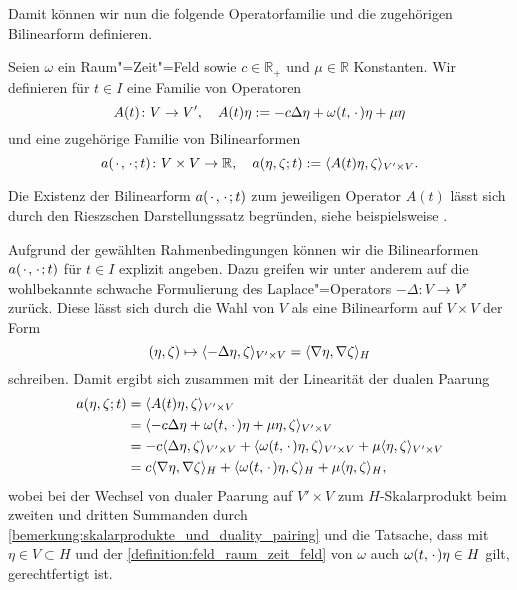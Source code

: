 Damit können wir nun die folgende Operatorfamilie und die zugehörigen Bilinearform definieren.

\begin{Definition}
\label{definition:operator_bilinearform_zeit}
    Seien $\omega$ ein Raum"=Zeit"=Feld sowie $c \in \mathbb{R}_{+}$ und $\mu \in \mathbb{R}$ Konstanten.
    Wir definieren für $t \in I$ eine Familie von Operatoren
    \begin{equation}
        \label{eq:operator_zeit}
        A(t) \colon V \to V', \quad  A(t) \eta := - c \Delta \eta + \omega(t, {\mkern2mu\cdot\mkern2mu}) \eta + \mu \eta
    \end{equation}
    und eine zugehörige Familie von Bilinearformen
    \begin{equation}
        \label{eq:bilinearform_zeit}
        a({\mkern2mu\cdot\mkern2mu}, {\mkern2mu\cdot\mkern2mu}; t) \colon V \times V \to \mathbb{R}, \quad  a(\eta, \zeta; t) := \langle A(t)\eta,\zeta\rangle_{V' \times V}.
    \end{equation}
\end{Definition}

\begin{Bemerkung}
\label{bemerkung:operator_bilinearform_riesz}
    Die Existenz der Bilinearform $a({\mkern2mu\cdot\mkern2mu}, {\mkern2mu\cdot\mkern2mu}; t)$ zum jeweiligen Operator $A(t)$ lässt sich durch den Rieszschen Darstellungssatz begründen, siehe beispielsweise \cite[Theorem \S{}22.1]{Halmos:1957vd}.
\end{Bemerkung}

Aufgrund der gewählten Rahmenbedingungen können wir die Bilinearformen $a({\mkern2mu\cdot\mkern2mu}, {\mkern2mu\cdot\mkern2mu}; t)$ für $t \in I$ explizit angeben.
Dazu greifen wir unter anderem auf die wohlbekannte schwache Formulierung des Laplace"=Operators $- \Delta \colon V \to V'$ zurück.
Diese lässt sich durch die Wahl von $V$ als eine Bilinearform auf $V \times V$ der Form
\begin{equation}
    (\eta, \zeta) \mapsto \langle- \Delta \eta,\zeta\rangle_{V' \times V} = \langle\nabla \eta,\nabla \zeta\rangle_{H}
\end{equation}
schreiben.
Damit ergibt sich zusammen mit der Linearität der dualen Paarung
\begin{equation}
\label{eq:bilinearform_formel}
    \begin{aligned}
        a(\eta, \zeta; t)
            &= \langle A(t) \eta,\zeta\rangle_{V' \times V}
          \\&= \langle-c\Delta \eta + \omega(t, {\mkern2mu\cdot\mkern2mu}) \eta + \mu \eta,\zeta\rangle_{V' \times V}
          \\&= - c\langle\Delta \eta,\zeta\rangle_{V' \times V} + \langle\omega(t, {\mkern2mu\cdot\mkern2mu}) \eta,\zeta\rangle_{V' \times V} + \mu \langle\eta,\zeta\rangle_{V' \times V}
          \\&= c\langle\nabla \eta,\nabla \zeta\rangle_{H} + \langle\omega(t, {\mkern2mu\cdot\mkern2mu}) \eta,\zeta\rangle_{H} + \mu \langle\eta,\zeta\rangle_{H},
    \end{aligned}
\end{equation}
wobei bei der Wechsel von dualer Paarung auf $V' \times V$ zum $H$-Skalarprodukt beim zweiten und dritten Summanden durch \cref{bemerkung:skalarprodukte_und_duality_pairing} und die Tatsache, dass mit $\eta \in V \subset H$ und der \cref{definition:feld_raum_zeit_feld} von $\omega$ auch $\omega(t, {\mkern2mu\cdot\mkern2mu}) \eta \in H$ gilt, gerechtfertigt ist.

